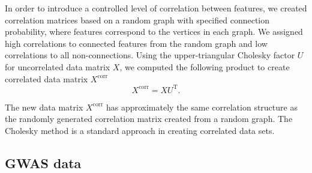 \documentclass[aoas]{imsart}
\begin{document}
In order to introduce a controlled level of correlation between features, we created correlation matrices based on a random graph with specified connection probability, where features correspond to the vertices in each graph. We assigned high correlations to connected features from the random graph and low correlations to all non-connections. Using the upper-triangular Cholesky factor $U$ for uncorrelated data matrix $X$, we computed the following product to create correlated data matrix $X^\text{corr}$
%
\begin{equation}\label{eq:cholesky}
X^\text{corr} = X U^\text{T}.
\end{equation}

The new data matrix $X^\text{corr}$ has approximately the same correlation structure as the randomly generated correlation matrix created from a random graph. The Cholesky method is a standard approach in creating correlated data sets.
%

\subsection{GWAS data}
\end{document}
